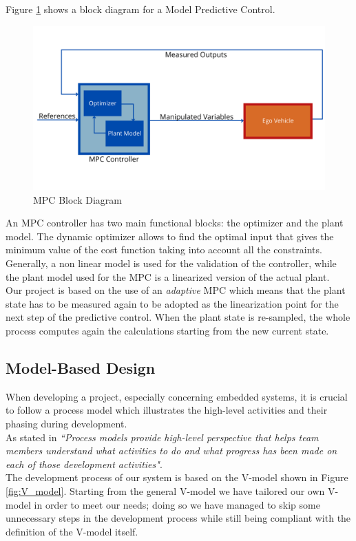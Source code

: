 Figure \ref{fig:MPC_Block} shows a block diagram for a Model Predictive Control.
\begin{figure}[H]
    \centering
    \includegraphics[width=1\textwidth]{Figures/mpcblock.png}
    \caption{MPC Block Diagram}
      \label{fig:MPC_Block}
\end{figure}
An MPC controller has two main functional blocks: the optimizer and the plant model.
The dynamic optimizer allows to find the optimal input that gives the minimum
value of the cost function taking into account all the constraints. Generally, a non linear model is used for the validation of the controller, while the plant model used for the MPC is a linearized version of the actual plant.\\
Our project is based on the use of an \emph{adaptive} MPC which means that the plant state has to be measured again to be adopted as the linearization point for the next step of the predictive control. When the plant state is re-sampled, the whole process
computes again the calculations starting from the new current state.

\subsection{Model-Based Design}
When developing a project, especially concerning embedded systems, it is crucial to follow a process model which illustrates the high-level activities and their phasing during development.\\
As stated in \cite{FOWLER20151} \emph{``Process models provide high-level perspective that helps team members understand what activities to do and what progress  has been made on each of those development activities"}.\\
The development process of our system is based on the V-model shown in Figure \ref{fig:V_model}.
Starting from the general V-model we have tailored our own V-model in order to meet our needs; doing so we have managed to skip some unnecessary steps in the development process while still being compliant with the definition of the V-model itself.

